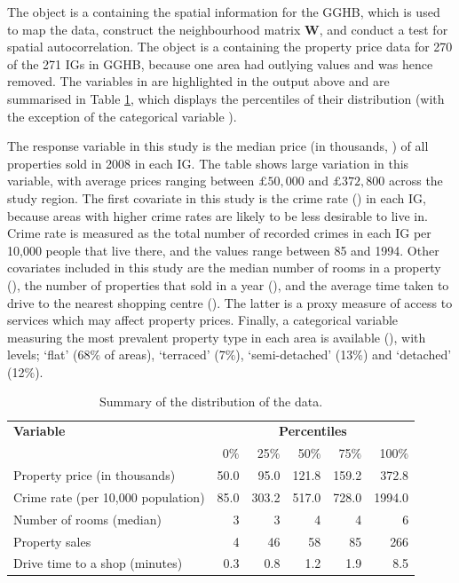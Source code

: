 \documentclass[article,shortnames,nojss]{jss}
\begin{document}
The  object is a  containing the spatial information for the GGHB, which is used to map the data, construct the neighbourhood matrix $\mathbf{W}$, and conduct a test for spatial autocorrelation. The  object is a   containing the property price data for 270 of the 271 IGs in GGHB, because one area had outlying values and was hence removed. The variables in  are highlighted in the output above and are summarised in Table \ref{table_scotland data}, which displays the percentiles of their distribution (with the exception of the categorical variable ). 

\hspace{1cm}The response variable in this study is the median price (in thousands, ) of all properties sold in 2008 in each IG. The table shows large variation in this variable, with average prices ranging between $\pounds 50,000$ and $\pounds 372,800$ across the study region. The first covariate in this study is the crime rate () in each IG, because areas with higher crime rates are likely to be less desirable to live in. Crime rate is measured as the total number of recorded crimes in each IG per 10,000 people that live there, and the values range between 85 and 1994. Other covariates included in this study are the median number of rooms in a property (), the number of properties that sold in a year (), and the average time taken to drive to the nearest shopping centre (). The latter is a proxy measure of access to services which may affect property prices. Finally, a categorical variable measuring the  most prevalent property type in each area is available (), with levels; `flat' (68$\%$ of areas), `terraced' (7$\%$), `semi-detached' (13$\%$) and `detached' (12$\%$). 

\begin{table}
\centering\begin{tabular}{lrrrrr}
\hline
\textbf{Variable}&\multicolumn{5}{c}{\textbf{Percentiles}}\\
&0$\%$&25$\%$&50$\%$&75$\%$&100$\%$\\\hline
Property price (in thousands)&50.0& 95.0 &121.8 &159.2 &372.8\\
Crime rate (per 10,000 population) &85.0&  303.2&  517.0&  728.0& 1994.0\\
Number of rooms (median)&3 &3 &4 &4 &6 \\
Property sales &4 & 46 & 58 & 85 & 266\\
Drive time to a shop (minutes)&0.3 & 0.8 & 1.2 & 1.9 & 8.5\\\hline
\end{tabular}
\caption{\label{table_scotland data} Summary of the distribution of the data.}
\end{table}
\end{document}
